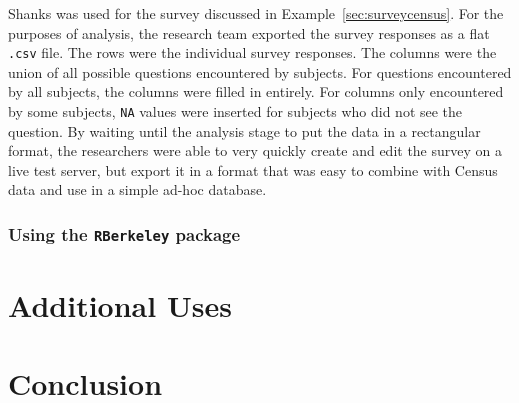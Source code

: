 \documentclass[]{article}
\begin{document}
Shanks was used for the survey discussed in Example~\ref{sec:surveycensus}.
For the purposes of analysis, the research team exported the survey responses
as a flat \texttt{.csv} file. The rows were the individual survey responses.
The columns were the union of all possible questions encountered by subjects.
For questions encountered by all subjects, the columns were filled in
entirely. For columns only encountered by some subjects, \texttt{NA} values
were inserted for subjects who did not see the question. By waiting until the
analysis stage to put the data in a rectangular format, the researchers were
able to very quickly create and edit the survey on a live test server, but
export it in a format that was easy to combine with Census data and use in a
simple ad-hoc database.

\subsubsection{Using the \texttt{RBerkeley} package}

\section{Additional Uses}
\label{sec:additionaluses}


\section{Conclusion}



\end{document}
